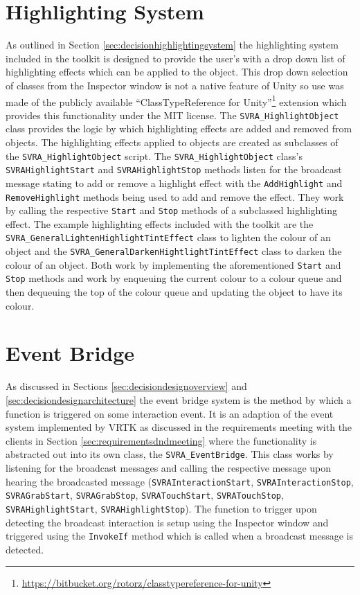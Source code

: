 \documentclass{l4proj}
\begin{document}
\section{Highlighting System}
\label{sec:implementationhighlighting}
As outlined in Section \ref{sec:decisionhighlightingsystem} the highlighting system included in the toolkit is designed to provide the user's with a drop down list of highlighting effects which can be applied to the object. This drop down selection of classes from the Inspector window is not a native feature of Unity so use was made of the publicly available ``ClassTypeReference for Unity''\footnote{\url{https://bitbucket.org/rotorz/classtypereference-for-unity}} extension which provides this functionality under the MIT license. The \texttt{SVRA\_HighlightObject} class provides the logic by which highlighting effects are added and removed from objects. The highlighting effects applied to objects are created as subclasses of the \texttt{SVRA\_HighlightObject} script. The \texttt{SVRA\_HighlightObject} class's \texttt{SVRAHighlightStart} and \texttt{SVRAHighlightStop} methods listen for the broadcast message stating to add or remove a highlight effect with the \texttt{AddHighlight} and \texttt{RemoveHighlight} methods being used to add and remove the effect. They work by calling the respective \texttt{Start} and \texttt{Stop} methods of a subclassed highlighting effect. The example highlighting effects included with the toolkit are the \texttt{SVRA\_GeneralLightenHighlightTintEffect} class to lighten the colour of an object and the  \texttt{SVRA\_GeneralDarkenHightlightTintEffect} class to darken the colour of an object. Both work by implementing the aforementioned \texttt{Start} and \texttt{Stop} methods and work by enqueuing the current colour to a colour queue and then dequeuing the top of the colour queue and updating the object to have its colour.

\section{Event Bridge}
\label{sec:implementationeventbridge}
As discussed in Sections \ref{sec:decisiondesignoverview} and \ref{sec:decisiondesignarchitecture} the event bridge system is the method by which a function is triggered on some interaction event. It is an adaption of the event system implemented by VRTK as discussed in the requirements meeting with the clients in Section \ref{sec:requirementsdndmeeting} where the functionality is abstracted out into its own class, the \texttt{SVRA\_EventBridge}. This class works by listening for the broadcast messages and calling the respective message upon hearing the broadcasted message (\texttt{SVRAInteractionStart}, \texttt{SVRAInteractionStop}, \texttt{SVRAGrabStart}, \texttt{SVRAGrabStop}, \texttt{SVRATouchStart}, \texttt{SVRATouchStop}, \texttt{SVRAHighlightStart}, \texttt{SVRAHighlightStop}). The function to trigger upon detecting the broadcast interaction is setup using the Inspector window and triggered using the \texttt{InvokeIf} method which is called when a broadcast message is detected.
\end{document}

